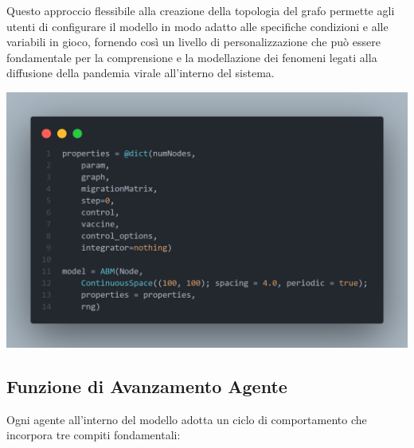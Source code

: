 Questo approccio flessibile alla creazione della topologia del grafo 
permette agli utenti di configurare il modello in modo adatto alle 
specifiche condizioni e alle variabili in gioco, fornendo così un 
livello di personalizzazione che può essere fondamentale per la 
comprensione e la modellazione dei fenomeni legati alla diffusione della 
pandemia virale all'interno del sistema.

\begin{minipage}{\linewidth}
    \centering
    \includegraphics[width=\textwidth]{img/sngraph_model.png}
    \label{fig:Model_code}
\end{minipage}

\subsection{Funzione di Avanzamento Agente}

Ogni agente all'interno del modello adotta un ciclo di comportamento che 
incorpora tre compiti fondamentali:

